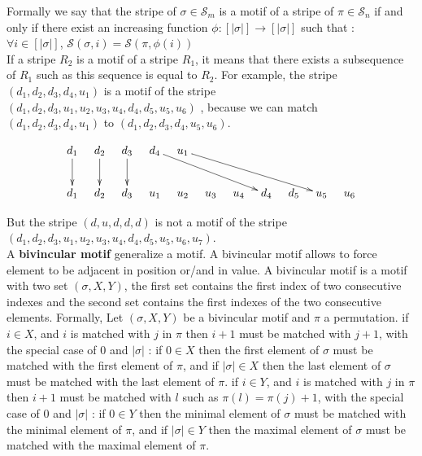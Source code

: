 \documentclass[a4paper]{llncs}
\newcommand{\Perm}[1]{\mathcal{S}_{#1}}
\newcommand{\ptext}{\pi}
\newcommand{\pmotif}{\sigma}
\newcommand{\x}{X}
\newcommand{\y}{Y}
\newcommand{\bmotif}{(\sigma,\x,\y)}
\newcommand{\dstep}{d}
\newcommand{\ustep}{u}
\begin{document}
		
		Formally we say that the stripe of $\pmotif \in \Perm{m}$ is a motif
		of a stripe of $\ptext \in \Perm{n}$ if and only if there exist an increasing function $\phi : [|\pmotif|] \rightarrow [|\pmotif|]$
		such that : \\
		$\forall i \in [|\pmotif|]$, $\mathcal{S}(\pmotif,i) = \mathcal{S}(\ptext,\phi(i))$\\
		If a stripe $R_2$ is a motif of a stripe $R_1$,
		it means that there exists
		a subsequence of $R_1$ such as
		this sequence is equal to $R_2$.
		For example, the stripe $(\dstep_1,\dstep_2,\dstep_3,\dstep_4,\ustep_1)$ is a motif of  the stripe \\
		$(\dstep_1,\dstep_2,\dstep_3,\ustep_1,\ustep_2,\ustep_3,\ustep_4,\dstep_4,\dstep_5,\ustep_5,\ustep_6)$ ,
		because we can match \\
		$(\dstep_1,\dstep_2,\dstep_3,\dstep_4,\ustep_1)$ to $(\dstep_1,\dstep_2,\dstep_3,\dstep_4,\ustep_5,\ustep_6)$.
		\begin{figure}[h!]
			\begin{displaymath}
				\xymatrix@=0.3cm{
					\dstep_1 \ar[dd] & \dstep_2 \ar[dd] & \dstep_3 \ar[dd] & \dstep_4\ar[ddrrrr]  & \ustep_1 \ar[ddrrrrr]\\
					\\
					\dstep_1 & \dstep_2 & \dstep_3 & \ustep_1 & \ustep_2 & \ustep_3 & \ustep_4 & \dstep_4 & \dstep_5 & \ustep_5 & \ustep_6 \\
				}
			\end{displaymath}     
		\end{figure}		
		But the stripe $(\dstep,\ustep,\dstep,\dstep,\dstep)$ is not a motif of the stripe\\ $(\dstep_1,\dstep_2,\dstep_3,\ustep_1,\ustep_2,\ustep_3,\ustep_4,\dstep_4,\dstep_5,\ustep_5,\ustep_6,\ustep_7)$.\\
		
		A \textbf{bivincular motif} generalize
		a motif. 
		A bivincular motif allows 
		to force element to be adjacent in position
		or/and in value.
		A bivincular motif
		is a motif with two set $\bmotif$,
		the first set contains the first index 
		of two consecutive indexes
		and the second set contains the first indexes
		of the two consecutive elements.
		Formally, Let $\bmotif$ 
		be a bivincular motif 
		and $\ptext$ a permutation.
		if $i \in \x$,
		and $i$ is matched with $j$ in $\ptext$
		then $i+1$ must be matched with $j+1$,
		with the special case of $0$ and $|\pmotif|$ :
		if $0 \in \x$ then the first element of $\pmotif$
		must be matched with the first element of $\ptext$,
		and if $|\pmotif| \in \x$ then the last element of $\pmotif$
		must be matched with the last element of $\ptext$.
		if $i \in \y$,
		and $i$ is matched with $j$ in $\ptext$
		then $i+1$ must be matched with $l$
		such as $\ptext(l)=\ptext(j)+1$,
		with the special case of $0$ and $|\pmotif|$ :
		if $0 \in \y$ then the minimal element of $\pmotif$
		must be matched with the minimal element of $\ptext$,
		and if $|\pmotif| \in \y$ then the maximal element of $\pmotif$
		must be matched with the maximal element of $\ptext$.		
			
\end{document}
